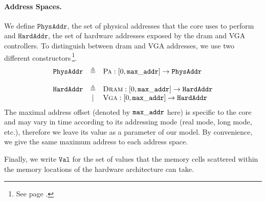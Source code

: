 \paragraph{Address Spaces.}
%
We define $\texttt{PhysAddr}$, the set of physical addresses that the core uses to
perform \IO and $\texttt{HardAddr}$, the set of hardware addresses exposed by the
\ac{dram} and VGA controllers.
%
To distinguish between \ac{dram} and VGA addresses, we use two different
constructors\,\footnote{See page \pageref{frontmatter:notations}.}.
%
\[
  \begin{array}{rcl}
    \texttt{PhysAddr}
    & \triangleq
    & \textsc{Pa} : [0, \val{max\_addr}] \rightarrow
      \texttt{PhysAddr} \\
    & %
    & \\ %
    \texttt{HardAddr}
    & \triangleq
    & \textsc{Dram} : [0, \val{max\_addr}] \rightarrow
      \texttt{HardAddr} \\
    & |
    & \textsc{Vga} : [0, \val{max\_addr}] \rightarrow
      \texttt{HardAddr}
  \end{array}
\]
%
The maximal address offset (denoted by $\mathtt{max\_addr}$ here) is specific to
the core and may vary in time according to its addressing mode (real mode, long
mode, etc.), therefore we leave its value as a parameter of our model.
%
By convenience, we give the same maximum address to each address space.

Finally, we write $\texttt{Val}$ for the set of values that the memory cells
scattered within the memory locations of the hardware architecture can take.

